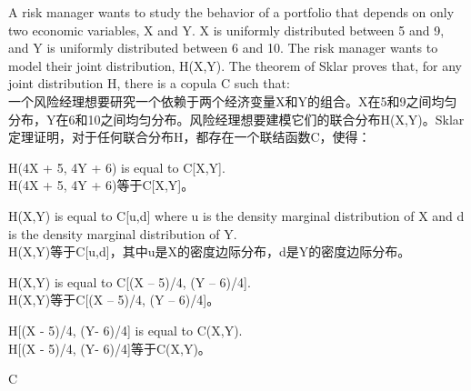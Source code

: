 \documentclass{article}
\newcounter{question} %
\begin{document}
\begin{question}
    A risk manager wants to study the behavior of a portfolio that depends on only two economic
    variables, X and Y. X is uniformly distributed between 5 and 9, and Y is uniformly distributed
    between 6 and 10. The risk manager wants to model their joint distribution, H(X,Y). The theorem
    of Sklar proves that, for any joint distribution H, there is a copula C such that:
    \\一个风险经理想要研究一个依赖于两个经济变量X和Y的组合。X在5和9之间均匀分布，Y在6和10之间均匀分布。风险经理想要建模它们的联合分布H(X,Y)。Sklar定理证明，对于任何联合分布H，都存在一个联结函数C，使得：
\end{question}

\begin{choices}
    \item H(4X + 5, 4Y + 6) is equal to C[X,Y].\\
        H(4X + 5, 4Y + 6)等于C[X,Y]。
    \item H(X,Y) is equal to C[u,d] where u is the density marginal distribution of X and d is the
    density marginal distribution of Y.\\
        H(X,Y)等于C[u,d]，其中u是X的密度边际分布，d是Y的密度边际分布。
    \item H(X,Y) is equal to C[(X – 5)/4, (Y – 6)/4].\\
        H(X,Y)等于C[(X – 5)/4, (Y – 6)/4]。
    \item H[(X - 5)/4, (Y- 6)/4] is equal to C(X,Y).\\
        H[(X - 5)/4, (Y- 6)/4]等于C(X,Y)。
\end{choices}

\begin{correctanswer}
    C
\end{correctanswer}
\end{document}

